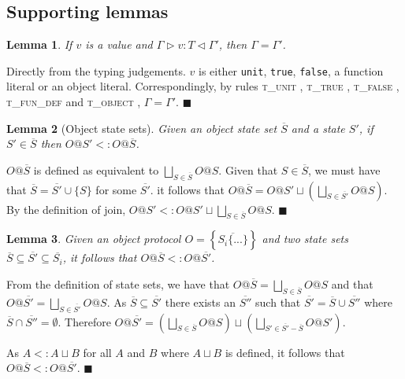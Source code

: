 \documentclass[preprint]{sigplanconf}
\newtheorem{lem}{Lemma}
\newcommand{\tunit}{\textsc{t\_unit} }
\newcommand{\ttrue}{\textsc{t\_true} }
\newcommand{\tfalse}{\textsc{t\_false} }
\newcommand{\tobj}{\textsc{t\_object} }
\newcommand{\tfundef}{\textsc{t\_fun\_def} }
\newcommand{\typerule}[4]{#1 \triangleright #2 : #3 \triangleleft #4}
\newcommand{\qed}{$\blacksquare$}
\newenvironment{proof}{\vspace{1ex}\noindent{\bf Proof}\hspace{0.5em}}
  {\hfill\qed\vspace{1ex}}
\begin{document}
\subsection{Supporting lemmas}
\label{app:proofs}


\begin{lem}
\label{lem:valuectx}
If $v$ is a value and $\typerule{\Gamma}{v}{T}{\Gamma'}$, then $\Gamma = \Gamma'$.
\end{lem}
\begin{proof}
Directly from the typing judgements. $v$ is either {\tt unit}, {\tt true},
{\tt false}, a function literal or an object literal.
Correspondingly, by rules \tunit,
\ttrue, \tfalse, 
\tfundef and \tobj, $\Gamma = \Gamma'$.
\end{proof}

\begin{lem}[Object state sets]
Given an object state set $\overline{S}$ and a state $S'$, if
$S' \in \overline{S}$ then $O@S' <: O@\overline{S}$.
\end{lem}
\begin{proof}
$O@\overline{S}$ is defined as equivalent to
$\bigsqcup_{S \in \overline{S}}{O@S}$. Given that $S \in \overline{S}$,
we must have that $\overline{S} = \overline{S'} \cup \{ S \}$ for
some $\overline{S'}$.
it follows that $O@\overline{S} = O@S' \sqcup \left( 
\bigsqcup_{S \in \overline{S'}}{O@S} \right)$.
By the definition of join, 
$O@S' <: O@S' \sqcup \bigsqcup_{S \in \overline{S}}{O@S}$.
\end{proof}


\begin{lem}
\label{lem:ssetinc}
Given an object protocol $O = \left\{ \overline{ S_i \{ ... \} } \right\}$ and two state sets 
$\overline{S} \subseteq \overline{S'} \subseteq \overline{S_i}$, it follows
that $O@\overline{S} <: O@\overline{S'}$.
\end{lem}
\begin{proof}
From the definition of state sets, we have that 
$O@\overline{S} = \bigsqcup_{S \in \overline{S}}{O@S}$ and that
$O@\overline{S'} = \bigsqcup_{S \in \overline{S'}}{O@S}$.
As $\overline{S} \subseteq \overline{S'}$ there exists an
$\overline{S''}$ such that $\overline{S'} = \overline{S} \cup \overline{S''}$
where $\overline{S} \cap \overline{S''} = \emptyset$. Therefore
$O@\overline{S'} = \left(\bigsqcup_{S \in \overline{S}}{O@S}\right) \sqcup \left(\bigsqcup_{S' \in \overline{S'} - \overline{S}}{O@S'}\right)$.

As $A <: A \sqcup B$ for all $A$ and $B$ where $A \sqcup B$ is defined, 
it follows that $O@\overline{S} <: O@\overline{S'}$.
\end{proof}
\end{document}
